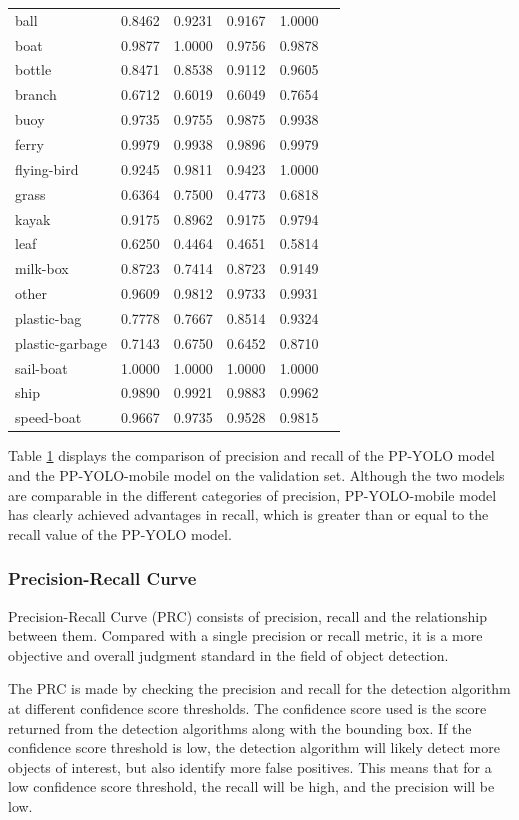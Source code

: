 \documentclass[sensors,article,submit,moreauthors,pdftex]{Definitions/mdpi}
\begin{document}
\begin{paracol}{2}
\begin{table}[htbp]
\begin{tabular}{lccccc}
\midrule
ball& 0.8462& 0.9231& 0.9167& 1.0000 \\
boat& 0.9877& 1.0000& 0.9756& 0.9878 \\
bottle& 0.8471& 0.8538& 0.9112& 0.9605 \\
branch& 0.6712& 0.6019& 0.6049& 0.7654 \\
buoy& 0.9735& 0.9755& 0.9875& 0.9938 \\
ferry& 0.9979& 0.9938& 0.9896& 0.9979 \\
flying-bird& 0.9245&0.9811 & 0.9423& 1.0000 \\
grass& 0.6364& 0.7500& 0.4773& 0.6818 \\
kayak& 0.9175& 0.8962& 0.9175& 0.9794 \\
leaf& 0.6250& 0.4464& 0.4651& 0.5814 \\
milk-box& 0.8723& 0.7414& 0.8723& 0.9149 \\
other& 0.9609& 0.9812& 0.9733& 0.9931 \\
plastic-bag& 0.7778& 0.7667& 0.8514& 0.9324 \\
plastic-garbage& 0.7143&0.6750 & 0.6452& 0.8710 \\
sail-boat& 1.0000& 1.0000& 1.0000& 1.0000 \\
ship& 0.9890& 0.9921& 0.9883& 0.9962 \\
speed-boat& 0.9667& 0.9735& 0.9528& 0.9815 \\

\bottomrule
\end{tabular}
\label{tbl:precision}
\end{table}

Table \ref{tbl:precision} displays the comparison of precision and recall of the PP-YOLO model and the PP-YOLO-mobile model on the validation set. Although the two models are comparable in the different categories of precision, PP-YOLO-mobile model has clearly achieved advantages in recall, which is greater than or equal to the recall value of the PP-YOLO model.


\subsubsection{Precision-Recall Curve}
Precision-Recall Curve (PRC) consists of precision, recall and the relationship between them. Compared with a single precision or recall metric, it is a more objective and overall judgment standard in the field of object detection. 

The PRC is made by checking the precision and recall for the detection algorithm at different confidence score thresholds. The confidence score used is the score returned from the detection algorithms along with the bounding box. If the confidence score threshold is low, the detection algorithm will likely detect more objects of interest, but also identify more false positives. This means that for a low confidence score threshold, the recall will be high, and the precision will be low.


\end{paracol}
\end{document}
